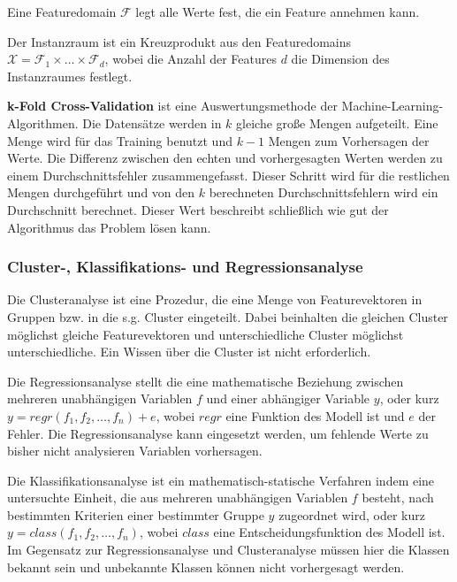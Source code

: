 \begin{term}[Featuredomain]
	Eine Featuredomain $\mathscr{F}$ legt alle Werte fest, die ein Feature annehmen kann. 
\end{term}

\begin{term}[Instanzraum]
Der Instanzraum ist ein Kreuzprodukt aus den Featuredomains $\mathscr{X} = \mathscr{F}_1 \times \dots \times \mathscr{F}_d$, wobei die Anzahl der Features $d$ die Dimension des Instanzraumes festlegt.
\end{term}



\begin{term}[Kreuzvalidierung]
\textbf{k-Fold Cross-Validation} ist eine Auswertungsmethode der Machine-Learning-Algorithmen. 
Die Datensätze werden in $k$ gleiche große Mengen aufgeteilt. 
Eine Menge wird für das Training benutzt und $k-1$ Mengen zum Vorhersagen der Werte. 
Die Differenz zwischen den echten und vorhergesagten Werten werden zu einem Durchschnittsfehler zusammengefasst. 
Dieser Schritt wird für die restlichen Mengen durchgeführt und von den $k$ berechneten Durchschnittsfehlern wird ein Durchschnitt berechnet. 
Dieser Wert beschreibt schließlich wie gut der Algorithmus das Problem lösen kann.
\end{term}

\subsubsection{Cluster-, Klassifikations- und Regressionsanalyse}
Die Clusteranalyse ist eine Prozedur, die eine Menge von Featurevektoren in Gruppen bzw. in die s.g. Cluster eingeteilt. Dabei beinhalten die gleichen Cluster möglichst gleiche Featurevektoren und unterschiedliche Cluster möglichst unterschiedliche. Ein Wissen über die Cluster ist nicht erforderlich.

Die Regressionsanalyse stellt die eine mathematische Beziehung zwischen mehreren unabhängigen Variablen $f$ und einer abhängiger Variable $y$, oder kurz $y = regr(f_1, f_2, \dots, f_n) + e$, wobei $regr$ eine Funktion des Modell ist und $e$ der Fehler.
Die Regressionsanalyse kann eingesetzt werden, um fehlende Werte zu bisher nicht analysieren Variablen vorhersagen.

Die Klassifikationsanalyse ist ein mathematisch-statische Verfahren indem eine untersuchte Einheit, die aus mehreren unabhängigen Variablen $f$ besteht, nach bestimmten Kriterien einer bestimmter Gruppe $y$ zugeordnet wird, oder kurz $y = class(f_1, f_2, \dots, f_n)$, wobei $class$ eine Entscheidungsfunktion des Modell ist. Im Gegensatz zur Regressionsanalyse und Clusteranalyse müssen hier die Klassen bekannt sein und unbekannte Klassen können nicht vorhergesagt werden.


